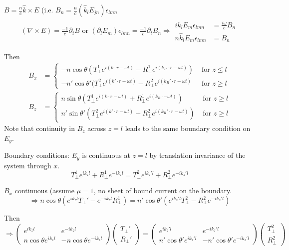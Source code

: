 \documentclass[twoside,10pt]{amsart}
\begin{document}
$B = \frac{n}{c} \hat{k} \times E$ (i.e. $B_n = \frac{ n}{c} (\hat{k}_l E_{jn}) \epsilon_{lmn}$  
\[
\begin{aligned}
  (\nabla \times E) = \frac{-1}{c} \partial_t B \text{ or } (\partial_l E_m) \epsilon_{lmn} = \frac{-1}{c} \partial_t B_n \Longrightarrow \begin{aligned} i k_l E_m \epsilon_{lmn} & = \frac{i \omega }{c} B_n \\ n \hat{k}_l E_m \epsilon_{lmn} & = B_n \end{aligned}
\end{aligned}
\]

Then
\[
\begin{aligned}
  B_x & = \begin{cases} -n \cos{\theta} ( T_{\perp}^1 e^{i (k\cdot r - \omega t)} - R_{\perp}^1 e^{ i (k_R \cdot r - \omega t) } ) & \text{ for } z \leq l \\ -n' \cos{\theta'} (T_{\perp}^2 e^{ i (k'\cdot r - \omega t)} - R_{\perp}^2 e^{ i (k_R' \cdot r - \omega t) } & \text{ for } z \geq l \end{cases}  \\
  B_z & = \begin{cases} n \sin{\theta} (T_{\perp}^1 e^{ i (k \cdot r - \omega t) } + R_{\perp}^1 e^{ i (k_R \cdot - \omega t)} ) & \text{ for } z \geq l \\ 
    n'\sin{\theta'} (T_{\perp}^2 e^{ i (k'\cdot r - \omega t)} + R_{\perp}^2 e^{i(k_R'\cdot r - \omega t)} ) & \text{ for } z \geq l 
\end{cases}
\end{aligned}
\]
Note that continuity in $B_z$ across $z=l$ leads to the same boundary condition on $E_y$.

Boundary conditions:
$E_y$ is continuous at $z=l$ by translation invariance of the system through $x$.  
\[
T_{\perp}^1 e^{ i k_z l } + R_{\perp}^1 e^{ - ik_z l} = T_{\perp}^2 e^{ i k_z' l} + R_{\perp}^2 e^{-i k_z' l}
\]

$B_x$ continuous (assume $\mu =1$, no sheet of bound current on the boundary.  
\[
\Longrightarrow n \cos{\theta} (e^{i k_z l }T_{\perp}' - e^{ -ik_z l} R_{\perp}^1 ) = n' \cos{\theta'} ( e^{ i k_z' l} T_{\perp}^2 - R_{\perp}^2 e^{ -i k_z' l } )
\]

Then
\[
\Longrightarrow \left( \begin{matrix} e^{ik_zl} & e^{-ik_zl} \\ n\cos{\theta} e^{ik_z l} & - n\cos{\theta} e^{-ik_z l } \end{matrix} \right) \left( \begin{matrix} T_{\perp}' \\ R_{\perp}' \end{matrix} \right) = \left( \begin{matrix} e^{ i k_z' l } & e^{ -i k_z' l } \\ n'\cos{\theta'} e^{ i k_z' l} & - n' \cos{\theta'} e^{ -i k_z' l } \end{matrix} \right) \left( \begin{matrix} T_{\perp}^2 \\ R_{\perp}^2 \end{matrix} \right)
\]
\end{document}
